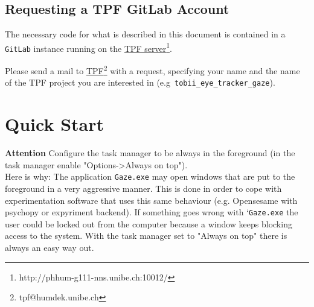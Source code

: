 \documentclass[a4paper,oneside]{book}
\begin{document}
\section{Requesting a TPF GitLab Account}
\label{sec.gitlab}
The necessary code for what is described in this document is contained in a \texttt{GitLab} instance running on the \href{http://phhum-g111-nns.unibe.ch:10012/}{TPF server}\footnote{http://phhum-g111-nns.unibe.ch:10012/}.

Please send a mail to \href{tpf@humdek.unibe.ch}{TPF}\footnote{tpf@humdek.unibe.ch} with a request, specifying your name and the name of the TPF project you are interested in (e.g~\texttt{tobii\_eye\_tracker\_gaze}).

\chapter{Quick Start}
\label{sec.quick}

\begin{mdframed}[backgroundcolor=boxbkg]\textbf{\color{red}Attention}
    Configure the task manager to be always in the foreground (in the task manager enable "Options->Always on top").\\
    Here is why: The application \texttt{Gaze.exe} may open windows that are put to the foreground in a very aggressive manner.
    This is done in order to cope with experimentation software that uses this same behaviour (e.g. Opensesame with psychopy or expyriment backend).
    If something goes wrong with `\texttt{Gaze.exe} the user could be locked out from the computer because a window keeps blocking access to the system.
    With the task manager set to "Always on top" there is always an easy way out.
\end{mdframed}
\end{document}
